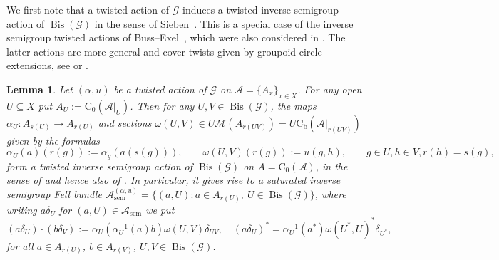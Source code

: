 \documentclass[11 pt, leqno]{amsart}
\numberwithin{equation}{section}
\theoremstyle{plain}
\newtheorem {lem} [thm]{Lemma}
\theoremstyle{definition}
\newcommand*{\contz}{\mathrm{C_0}}%
\newcommand*{\contb}{\mathrm{C_b}}%
\DeclareMathOperator{\sem}{sem}
\DeclareMathOperator{\Bis}{Bis}
\newcommand{\M}{\mathcal M}
\newcommand{\G}{\mathcal G} %
\newcommand{\A}{\mathcal A}
\begin{document}
We first note that a twisted action of $\G$ induces a twisted inverse semigroup action of $\Bis(\G)$ in the sense of Sieben~\cite{Sieben98}. 
This is a special case of the inverse semigroup twisted actions of Buss--Exel~\cite[Section 5]{BussExel0}, which were also considered in \cite[Section 2]{BartoszKangAdam}. 
The latter actions are more general and cover  twists given by groupoid circle extensions,  see \cite[Theorem~7.2]{BussExel0} or \cite[Theorem~2.16]{BartoszKangAdam}.

\begin{lem}\label{lem:inverse_semigroup_twisted_action}
Let $(\alpha,u)$ be a twisted action of $\G$ on $\A = \{ A_x \}_{x\in X}$. 
For any open $U\subseteq X$ put $A_U:=\contz(\A|_{U})$. 
Then for any $U,V\in \Bis(\G)$, the  maps $\alpha_{U}:A_{s(U)}\to A_{r(U)}$ and  sections $\omega(U, V)\in U\M(A_{r(UV)})=U\contb(\A|_{r(UV)})$ given by the formulas
\[
    \alpha_{U}(a)(r(g)):= \alpha_{g}(a (s(g))),\qquad   \omega(U, V)(r(g)):=u(g,h), \qquad g\in U, h\in V, r(h)=s(g),
\]
form a twisted inverse semigroup action of $\Bis(\G)$ on $A=\contz(\A)$, in the sense of \cite{Sieben98} and hence also of \cite{BussExel0}. 
In particular, it gives rise to a saturated inverse semigroup Fell bundle $\A_{\sem}^{(\alpha,u)} = \{ (a, U) : a\in A_{r(U)} ,\ U\in \Bis(\G) \}$, where writing $a\delta_U$ for $(a,U)\in \A_{\sem}$ we put
\[
    (a\delta_U)\cdot (b\delta_V):= \alpha_U(\alpha_{U}^{-1}(a)b)\omega(U,V) \delta_{UV}, \quad  (a\delta_U)^*=\alpha_U^{-1}(a^*)\omega(U^*,U)^*\delta_{U^*},
\]
for all $a\in A_{r(U)}$, $b\in  A_{r(V)}$, $U,V\in \Bis(\G)$.
\end{lem}
\end{document}
